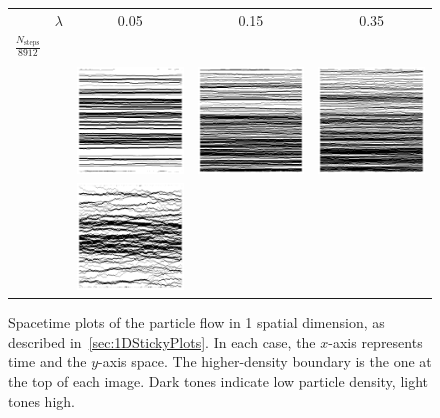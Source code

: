 \begin{figure} \caption[The flow pattern of sticky particles in $1$D]{Spacetime plots of the particle flow
in 1 spatial dimension, as described in~\ref{sec:1DStickyPlots}. In each case, the $x$-axis represents time
and the $y$-axis space. The higher-density boundary is the one at the top of each image. Dark tones 
indicate low particle density, light tones high.} \renewcommand{\arraystretch}{-0.5}
\label{fig:1DStickyPlots}
\begin{center}
\begin{tabular}{c @{\hskip -0.5em} c| c @{\hskip -0.5em} c @{\hskip -0.5em} c} 
 & $\lambda$ & 0.05 & 0.15 & 0.35 \\
 $\frac{N_\mathrm{steps}}{8912}$ & & & &  \\ 
 \hline
 \rule{0pt}{0.1\normalbaselineskip} & & & & \\
 \raisebox{5em}{1}  &  & \includegraphics[width=0.31\linewidth]{numerics/images/stickyParticleFlows/flowImpL0p05T1p32.png}
 & \includegraphics[width=0.31\linewidth]{numerics/images/stickyParticleFlows/flowImpL0p15T1p32.png} 
 & \includegraphics[width=0.31\linewidth]{numerics/images/stickyParticleFlows/flowImpL0p35T1p32.png} \\ 
\raisebox{5em}{32} & & \includegraphics[width=0.31\linewidth]{numerics/images/stickyParticleFlows/flowImpL0p05T1p0.png} 

\end{tabular}
\end{center}
\end{figure}

